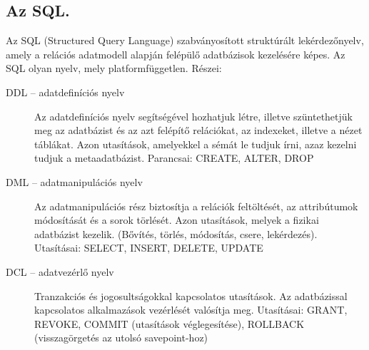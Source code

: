 \subsection{Az SQL.}
Az SQL (Structured Query Language) szabványosított struktúrált lekérdezőnyelv, amely a relációs adatmodell alapján felépülő adatbázisok kezelésére képes. Az SQL olyan nyelv, mely platformfüggetlen. Részei:
\begin{description}
	\item[DDL -- adatdefiníciós nyelv] Az adatdefiníciós nyelv segítségével hozhatjuk létre, illetve szüntethetjük meg az adatbázist és az azt felépítő relációkat, az indexeket, illetve a nézet táblákat. Azon utasítások, amelyekkel a sémát le tudjuk írni, azaz kezelni tudjuk a metaadatbázist. Parancsai: CREATE, ALTER, DROP
	\item[DML -- adatmanipulációs nyelv] Az adatmanipulációs rész biztosítja a relációk feltöltését, az attribútumok módosítását és a sorok törlését. Azon utasítások, melyek a fizikai adatbázist kezelik. (Bővítés, törlés, módosítás, csere, lekérdezés). Utasításai: SELECT, INSERT, DELETE, UPDATE
	\item[DCL -- adatvezérlő nyelv]	Tranzakciós és jogosultságokkal kapcsolatos utasítások. Az adatbázissal kapcsolatos alkalmazások vezérlését valósítja meg. Utasításai: GRANT, REVOKE, COMMIT (utasítások véglegesítése), ROLLBACK (visszagörgetés az utolsó savepoint-hoz)
\end{description}
